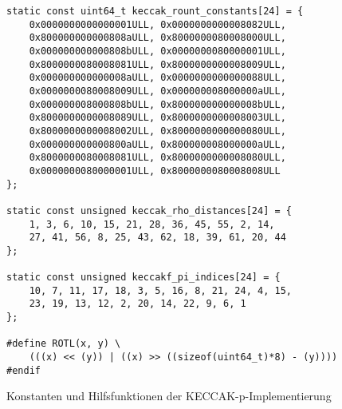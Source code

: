\begin{figure}
\lstset{xleftmargin=2em}
\lstset{language=C}
\begin{lstlisting}[label={lst:keccak_impl_utils}]
static const uint64_t keccak_rount_constants[24] = {
    0x0000000000000001ULL, 0x0000000000008082ULL,
    0x800000000000808aULL, 0x8000000080008000ULL,
    0x000000000000808bULL, 0x0000000080000001ULL,
    0x8000000080008081ULL, 0x8000000000008009ULL,
    0x000000000000008aULL, 0x0000000000000088ULL,
    0x0000000080008009ULL, 0x000000008000000aULL,
    0x000000008000808bULL, 0x800000000000008bULL,
    0x8000000000008089ULL, 0x8000000000008003ULL,
    0x8000000000008002ULL, 0x8000000000000080ULL,
    0x000000000000800aULL, 0x800000008000000aULL,
    0x8000000080008081ULL, 0x8000000000008080ULL,
    0x0000000080000001ULL, 0x8000000080008008ULL
};

static const unsigned keccak_rho_distances[24] = {
    1, 3, 6, 10, 15, 21, 28, 36, 45, 55, 2, 14,
	27, 41, 56, 8, 25, 43, 62, 18, 39, 61, 20, 44
};

static const unsigned keccakf_pi_indices[24] = {
    10, 7, 11, 17, 18, 3, 5, 16, 8, 21, 24, 4, 15,
	23, 19, 13, 12, 2, 20, 14, 22, 9, 6, 1
};

#define ROTL(x, y) \
	(((x) << (y)) | ((x) >> ((sizeof(uint64_t)*8) - (y))))
#endif
\end{lstlisting}
\caption{Konstanten und Hilfsfunktionen der KECCAK-p-Implementierung}
\label{fig:keccak_impl_utils}
\end{figure}

